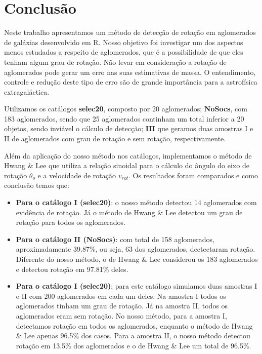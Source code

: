 %
\chapter{Conclusão}\label{chap:conclusao}
Neste trabalho apresentamos um método de detecção de rotação em aglomerados de galáxias desenvolvido em R. Nosso objetivo foi investigar um dos aspectos menos estudados a respeito de aglomerados, que é a possibilidade de que eles tenham algum grau de rotação. Não levar em consideração a rotação de aglomerados pode gerar um erro nas suas estimativas de massa. O entendimento, controle e redução deste tipo de erro são de grande importância para a astrofísica extragaláctica. 

Utilizamos os catálogos \textbf{selec20}, composto por 20 aglomerados; \textbf{NoSocs}, com 183 aglomerados, sendo que 25 aglomerados continham um total inferior a 20 objetos, sendo inviável o cálculo de detecção; \textbf{III} que geramos duas amostras I e II de aglomerados com grau de rotação e sem rotação, respectivamente. 

Além da aplicação do nosso método nos catálogos, implementamos o método de Hwang \& Lee que utiliza a relação sinoidal para o cálculo do ângulo do eixo de rotação $\theta_o$ e a velocidade de rotação $v_{rot}$. Os resultados foram comparados e como conclusão temos que:

\begin{itemize}
   \item \textbf{Para o catálogo I (selec20)}: o nosso método detectou 14 aglomerados com evidência de rotação. Já o método de Hwang \& Lee detectou um grau de rotação para todos os aglomerados. 
   \item \textbf{Para o catálogo II (NoSocs)}: com total de 158 aglomerados, aproximadamente 39.87\%, ou seja, 63 dos aglomerados, dectectaram rotação. Diferente do nosso método, o de Hwang \& Lee considerou os 183 aglomerados e detectou rotação em 97.81\% deles.   
   \item \textbf{Para o catálogo I (selec20)}: para este catálogo simulamos duas amostras I e II com 200 aglomerados em cada um deles. Na amostra I todos os aglomerados tinham um grau de rotação. Já na amostra II, todos os aglomerados eram sem rotação. No nosso método, para a amostra I, detectamos rotação em todos os aglomerados, enquanto o método de Hwang \& Lee apenas 96.5\% dos casos. Para a amostra II, o nosso método detectou rotação em 13.5\% dos aglomerados e o de Hwang \& Lee um total de 96.5\%.
 \end{itemize}     

